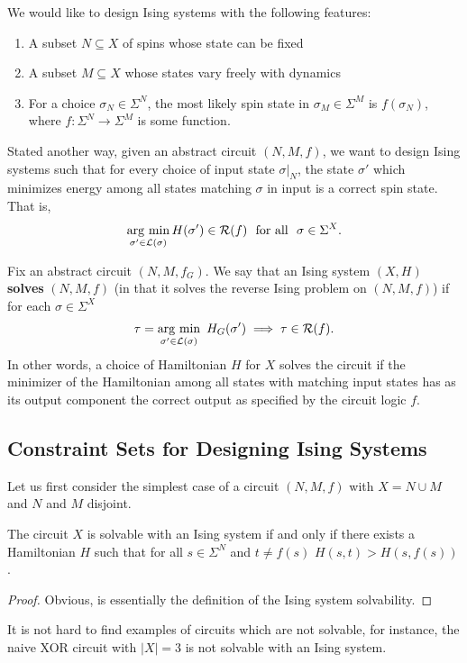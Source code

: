 \documentclass{article}
\begin{document}
We would like to design Ising systems with the following features:
\begin{enumerate}[(1)]
  \item A subset $N \subseteq X$ of spins whose state can be fixed
  \item A subset $M \subseteq X$ whose states vary freely with dynamics
  \item For a choice $\sigma_N \in \Sigma^N$, the most likely spin state in $\sigma_M \in \Sigma^M$ is $f(\sigma_N)$, where $f: \Sigma^N \to \Sigma^M$ is some function.
\end{enumerate}
Stated another way, given an abstract circuit $(N,M,f)$, we want to design Ising systems such that for every choice of input state $\sigma|_N$, the state $\sigma'$ which minimizes energy among all states matching $\sigma$ in input is a correct spin state. That is,
\begin{align*}
  \operatorname*{arg ~ min}_{\sigma' \in \mathcal{L}(\sigma)} H(\sigma') \in \mathcal{R}(f) ~ \text{ for all } ~ \sigma \in \Sigma^X.
\end{align*}

\begin{defn}\label{defn:solves-ising-circuit}
  Fix an abstract circuit $(N, M, f_G)$. We say that an Ising system $(X, H)$ \textbf{solves} $(N, M, f)$ (in that it solves the reverse Ising problem on $(N,M,f)$) if for each $\sigma \in \Sigma^X$ 
  \begin{align*}
    \tau = \operatorname*{arg ~ min}_{\sigma' \in \mathcal{L}(\sigma)} ~H_G(\sigma') \implies \tau \in \mathcal{R}(f).
  \end{align*}
  In other words, a choice of Hamiltonian $H$ for $X$ solves the circuit if the minimizer of the Hamiltonian among all states with matching input states has as its output component the correct output as specified by the circuit logic $f$.
\end{defn}

\subsection{Constraint Sets for Designing Ising Systems}
Let us first consider the simplest case of a circuit $(N, M, f)$ with $X = N \cup M$ and $N$ and $M$ disjoint.
\begin{lem}\label{lem:original-constraint-set}
  The circuit $X$ is solvable with an Ising system if and only if there exists a Hamiltonian $H$ such that for all $s\in \Sigma^N$ and $t \neq f(s)$ $H(s,t) > H(s,f(s))$.
\end{lem}
\begin{proof}
  Obvious, is essentially the definition of the Ising system solvability.
\end{proof}
It is not hard to find examples of circuits which are not solvable, for instance, the naive XOR circuit with $|X| = 3$ is not solvable with an Ising system.
\end{document}
